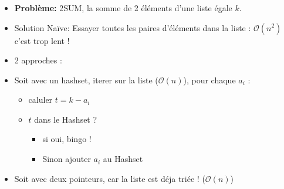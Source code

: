 \begin{frame}
    \frametitle{\problemtitle}
    \begin{itemize}
        \item<+-> \textbf{Problème:} 2SUM, la somme de 2 éléments d'une liste égale $k$.
        \item<+-> Solution Na\"ive: Essayer toutes les paires d'éléments dans la liste : $\mathcal O(n^2)$ c'est trop lent !
        \item<+-> 2 approches :
        \item<+-> Soit avec un hashset, iterer sur la liste ($\mathcal O(n)$), pour chaque $a_i$ :
        \begin{itemize}
            \item<+-> caluler $t = k - a_i$
            \item<+-> $t$ dans le Hashset ?
            \begin{itemize}
                \item si oui, bingo !
                \item Sinon ajouter $a_i$ au Hashset
            \end{itemize}
        \end{itemize}
        \item<+-> Soit avec deux pointeurs, car la liste est déja triée ! ($\mathcal O(n)$)
    \end{itemize}
\end{frame}
